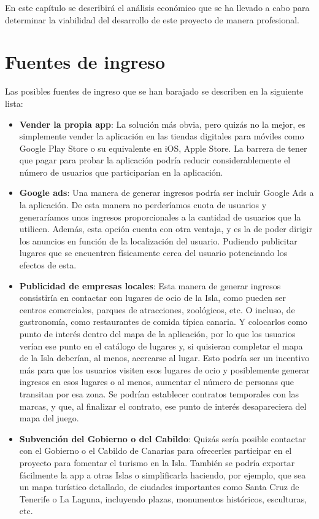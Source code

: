 En este capítulo se describirá el análisis económico que se ha llevado a cabo para determinar la viabilidad del desarrollo de este proyecto de manera profesional.

\section{Fuentes de ingreso}
Las posibles fuentes de ingreso que se han barajado se describen en la siguiente lista:
\begin{itemize}
\item \textbf{Vender la propia app}: La solución más obvia, pero quizás no la mejor, es simplemente vender la aplicación en las tiendas digitales para móviles como Google Play Store o su equivalente en iOS, Apple Store. La barrera de tener que pagar para probar la aplicación podría reducir considerablemente el número de usuarios que participarían en la aplicación.

\item \textbf{Google ads}: Una manera de generar ingresos podría ser incluir Google Ads a la aplicación. De esta manera no perderíamos cuota de usuarios y generaríamos unos ingresos proporcionales a la cantidad de usuarios que la utilicen. Además, esta opción cuenta con otra ventaja, y es la de poder dirigir los anuncios en función de la localización del usuario. Pudiendo publicitar lugares que se encuentren físicamente cerca del usuario potenciando los efectos de esta.

\item \textbf{Publicidad de empresas locales}: Esta manera de generar ingresos consistiría en contactar con lugares de ocio de la Isla, como pueden ser centros comerciales, parques de atracciones, zoológicos, etc. O incluso, de gastronomía, como restaurantes de comida típica canaria. Y colocarlos como punto de interés dentro del mapa de la aplicación, por lo que los usuarios verían ese punto en el catálogo de lugares y, si quisieran completar el mapa de la Isla deberían, al menos, acercarse al lugar. Esto podría ser un incentivo más para que los usuarios visiten esos lugares de ocio y posiblemente generar ingresos en esos lugares o al menos, aumentar el número de personas que transitan por esa zona. Se podrían establecer contratos temporales con las marcas, y que, al finalizar el contrato, ese punto de interés desapareciera del mapa del juego.

\item \textbf{Subvención del Gobierno o del Cabildo}: Quizás sería posible contactar con el Gobierno o el Cabildo de Canarias para ofrecerles participar en el proyecto para fomentar el turismo en la Isla. También se podría exportar fácilmente la app a otras Islas o simplificarla haciendo, por ejemplo, que sea un mapa turístico detallado, de ciudades importantes como Santa Cruz de Tenerife o La Laguna, incluyendo plazas, monumentos históricos, esculturas, etc.
\end{itemize}

